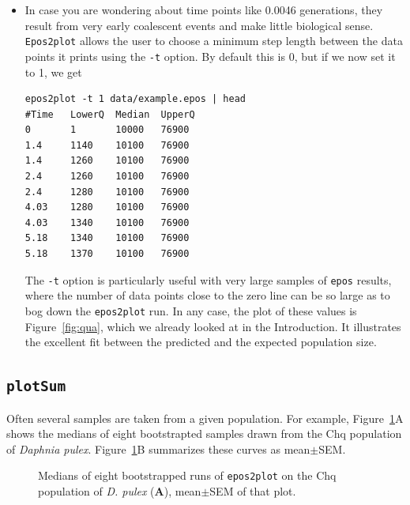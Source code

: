 \documentclass[a4paper]{article}
\newcommand{\ty}{\texttt}
\begin{document}
\begin{itemize}
\item In case you are wondering about time points like 0.0046
  generations, they result from very early coalescent events and make
  little biological sense. \ty{Epos2plot} allows the user to choose a
  minimum step length between the data points it prints using the
  \ty{-t} option. By default this is 0, but if we now set it to 1, we
  get
\begin{verbatim}
epos2plot -t 1 data/example.epos | head
#Time   LowerQ	Median	UpperQ
0       1       10000   76900
1.4     1140    10100   76900
1.4     1260    10100   76900
2.4     1260    10100   76900
2.4     1280    10100   76900
4.03    1280    10100   76900
4.03    1340    10100   76900
5.18    1340    10100   76900
5.18    1370    10100   76900
\end{verbatim}
The \ty{-t} option is particularly useful with very large samples of
\ty{epos} results, where the number of data points close to the zero
line can be so large as to bog down the \ty{epos2plot} run.  In any
case, the plot of these values is Figure~\ref{fig:qua}, which we
already looked at in the Introduction. It illustrates the excellent
fit between the predicted and the expected population size.
\end{itemize}
\subsection{\ty{plotSum}}
Often several samples are taken from a given population. For example,
Figure~\ref{fig:chq}A shows the medians of eight bootstrapted samples
drawn from the Chq population of \textit{Daphnia
  pulex}. Figure~\ref{fig:chq}B summarizes these curves as
mean$\pm$SEM.

\begin{figure}
  \begin{center}
  \end{center}
  \caption{Medians of eight bootstrapped runs of \ty{epos2plot} on the
    Chq population of \textit{D. pulex} (\textbf{A}), mean$\pm$SEM of
    that plot.}\label{fig:chq}
\end{figure}



\end{document}
